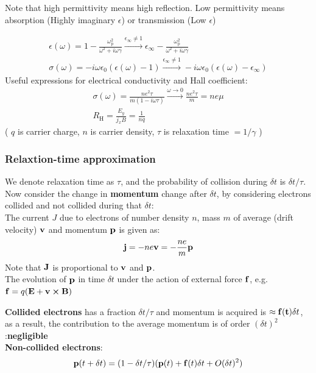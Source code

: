 \documentclass[12pt,a4paper]{article}
\begin{document}
    Note that high permittivity means high reflection. Low permittivity means absorption (Highly imaginary $\epsilon$) or transmission (Low $\epsilon$)

    $$
    \begin{gathered}
    \epsilon(\omega)=1-\frac{\omega_{\mathrm{p}}^2}{\omega^2+i \omega \gamma} \stackrel{\epsilon_{\infty} \neq 1}{\longrightarrow} \epsilon_{\infty}-\frac{\omega_{\mathrm{p}}^2}{\omega^2+i \omega \gamma} \\
    \sigma(\omega)=-i \omega \epsilon_0(\epsilon(\omega)-1) \stackrel{\epsilon_{\infty} \neq 1}{\longrightarrow}-i \omega \epsilon_0\left(\epsilon(\omega)-\epsilon_{\infty}\right)
    \end{gathered}
    $$
    Useful expressions for electrical conductivity and Hall coefficient:
    $$
    \begin{gathered}
    \sigma(\omega)=\frac{n e^2 \tau}{m(1-i \omega \tau)} \stackrel{\omega \rightarrow 0}{\longrightarrow} \frac{n e^2 \tau}{m}=n e \mu \\
    R_{\mathrm{H}}= \frac{E_y}{j_x B}=\frac{1}{n q}
    \end{gathered}
    $$
    ( $q$ is carrier charge, $n$ is carrier density, $\tau$ is relaxation time $=1 / \gamma$ )
    \subsubsection{Relaxtion-time approximation}
        We denote relaxation time as $\tau$, and the probability of collision during $\delta t$ is $\delta t/\tau$.
        Now consider the change in \textbf{momentum} change after $\delta t$, by considering electrons collided and not collided during that $\delta t$:\\
        The current $J$ due to electrons of number density $n$, mass $m$ of average (drift velocity) $\vb{v}$ and momentum $\vb{p}$ is given as:
        \begin{equation}
            \vb{j}=-ne\vb{v}=-\frac{ne}{m}\vb{p}
        \end{equation}
        Note that $\vb{J}$ is proportional to $\vb{v}$ and $\vb{p}$.\\
        The evolution of $\vb{p}$ in time $\delta t$ under the action of external force $\vb{f}$, e.g. $\vb{f}=q(\vb{E}+\vb{v}\crossproduct\vb{B})$

        \indent \textbf{Collided electrons} has a fraction $\delta t/\tau$ and momentum is acquired is $\approx \vb{f(t)}\delta t$, as a result, the contribution to the average momentum is of order $(\delta t)^2$:\textbf{negligible}\\
        \indent \textbf{Non-collided electrons}: 
        \begin{equation}
            \vb{p}(t+\delta t) = (1- \delta t/\tau)(\vb{p}(t)+\vb{f}(t)\delta t+ O(\delta t)^2)
        \end{equation}
\end{document}
